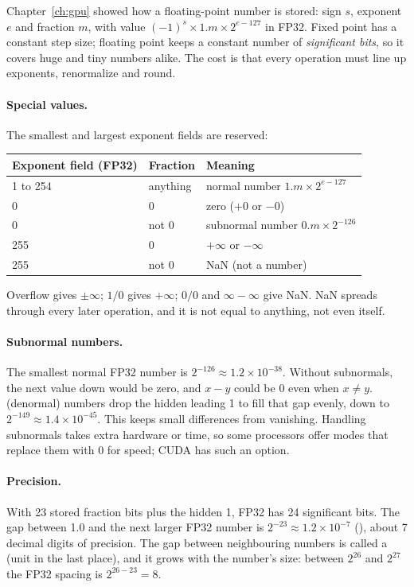 Chapter~\ref{ch:gpu} showed how a floating-point number is stored: sign $s$, exponent $e$ and fraction $m$, with value $(-1)^s \times 1.m \times 2^{e - 127}$ in FP32. Fixed point has a constant step size; floating point keeps a constant number of \emph{significant bits}, so it covers huge and tiny numbers alike. The cost is that every operation must line up exponents, renormalize and round.

\paragraph{Special values.} The smallest and largest exponent fields are reserved:
\begin{center}
\begin{tabular}{lll}
\toprule
Exponent field (FP32) & Fraction & Meaning \\
\midrule
1 to 254 & anything & normal number $1.m \times 2^{e-127}$ \\
0 & 0 & zero ($+0$ or $-0$) \\
0 & not 0 & subnormal number $0.m \times 2^{-126}$ \\
255 & 0 & $+\infty$ or $-\infty$ \\
255 & not 0 & NaN (not a number) \\
\bottomrule
\end{tabular}
\end{center}
Overflow gives $\pm\infty$; $1/0$ gives $+\infty$; $0/0$ and $\infty - \infty$ give NaN. NaN spreads through every later operation, and it is not equal to anything, not even itself.

\paragraph{Subnormal numbers.} The smallest normal FP32 number is $2^{-126} \approx 1.2\times10^{-38}$. Without subnormals, the next value down would be zero, and $x - y$ could be 0 even when $x \ne y$.  (denormal) numbers drop the hidden leading 1 to fill that gap evenly, down to $2^{-149} \approx 1.4\times10^{-45}$. This  keeps small differences from vanishing. Handling subnormals takes extra hardware or time, so some processors offer  modes that replace them with 0 for speed; CUDA has such an option.

\paragraph{Precision.} With 23 stored fraction bits plus the hidden 1, FP32 has 24 significant bits. The gap between 1.0 and the next larger FP32 number is $2^{-23} \approx 1.2\times10^{-7}$ (), about 7 decimal digits of precision. The gap between neighbouring numbers is called a  (unit in the last place), and it grows with the number's size: between $2^{26}$ and $2^{27}$ the FP32 spacing is $2^{26-23} = 8$.

